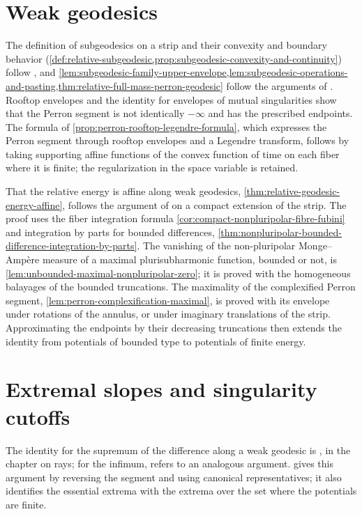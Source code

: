 \section{Weak geodesics}\label{sec:history-weak-geodesics}
The definition of subgeodesics on a strip and their convexity and boundary behavior (\cref{def:relative-subgeodesic,prop:subgeodesic-convexity-and-continuity}) follow \cite[Definition~4.1.1 and Proposition~4.1.2]{XiaSampleBook}, and \cref{lem:subgeodesic-family-upper-envelope,lem:subgeodesic-operations-and-pasting,thm:relative-full-mass-perron-geodesic} follow the arguments of \cite[Proposition~4.1.3, Lemma~4.1.1 and Proposition~4.2.1]{XiaSampleBook}. Rooftop envelopes and the identity for envelopes of mutual singularities show that the Perron segment is not identically $-\infty$ and has the prescribed endpoints. The formula of \cref{prop:perron-rooftop-legendre-formula}, which expresses the Perron segment through rooftop envelopes and a Legendre transform, follows by taking supporting affine functions of the convex function of time on each fiber where it is finite; the regularization in the space variable is retained.

That the relative energy is affine along weak geodesics, \cref{thm:relative-geodesic-energy-affine}, follows the argument of \cite[Proposition~4.3.3]{XiaSampleBook} on a compact extension of the strip. The proof uses the fiber integration formula \cref{cor:compact-nonpluripolar-fibre-fubini} and integration by parts for bounded differences, \cref{thm:nonpluripolar-bounded-difference-integration-by-parts}. The vanishing of the non-pluripolar Monge--Amp\`ere measure of a maximal plurisubharmonic function, bounded or not, is \cref{lem:unbounded-maximal-nonpluripolar-zero}; it is proved with the homogeneous balayages of the bounded truncations. The maximality of the complexified Perron segment, \cref{lem:perron-complexification-maximal}, is proved with its envelope under rotations of the annulus, or under imaginary translations of the strip. Approximating the endpoints by their decreasing truncations then extends the identity from potentials of bounded type to potentials of finite energy.

\section{Extremal slopes and singularity cutoffs}\label{sec:history-geodesic-rays}
The identity for the supremum of the difference along a weak geodesic is \cite[Proposition 4.2.2]{XiaSampleBook}, in the chapter on rays; for the infimum, \cite[Proposition~4.2.3]{XiaSampleBook} refers to an analogous argument.  gives this argument by reversing the segment and using canonical representatives; it also identifies the essential extrema with the extrema over the set where the potentials are finite.


